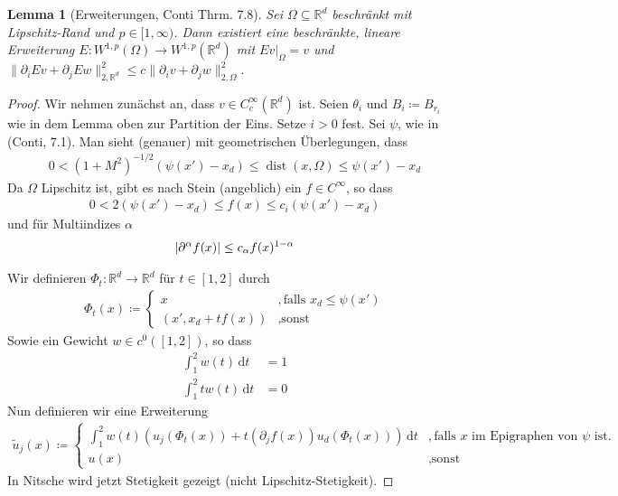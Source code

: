\documentclass{scrartcl}
\newcounter{everything}
\newtheorem{lemma}[everything]{Lemma}
\def\R{\mathbb{R}}
\newcommand{\dif}[1]{\,\mathrm{d} #1}
\newcommand{\norm}[1]{\lVert #1 \rVert}
\DeclareMathOperator{\dist}{dist}			%
\DeclarePairedDelimiter{\abs}{|}{|}
\begin{document}
\begin{lemma}[Erweiterungen, Conti Thrm. 7.8]
	Sei $\Omega\subseteq\R^d$ beschränkt mit Lipschitz-Rand und $p\in[1,\infty)$. Dann existiert eine beschränkte, lineare Erweiterung $E\colon W^{1,p}(\Omega)\to W^{1,p}(\R^d)$ mit $Ev\vert_\Omega = v$ und $\norm{\partial_iEv+\partial_jEw}_{2,\R^d}^2 \leq c\norm{\partial_iv+\partial_jw}_{2,\Omega}^2$.
\end{lemma}
\begin{proof}
	Wir nehmen zunächst an, dass $v\in C_c^\infty(\R^d)$ ist. Seien $\theta_i$ und $B_i\coloneqq B_{r_i}$ wie in dem Lemma oben zur Partition der Eins. Setze $i>0$ fest. Sei $\psi$, wie in (Conti, 7.1). Man sieht  (genauer) mit geometrischen Überlegungen, dass
	\begin{align*}
		0<(1+M^2)^{-1/2}(\psi(x')-x_d)\leq \dist(x,\Omega)\leq \psi(x')-x_d
	\end{align*}
	Da $\Omega$ Lipschitz ist, gibt es nach Stein (angeblich) ein $f\in C^\infty$, so dass
	\begin{align*}
		0 < 2(\psi(x')-x_d)\leq f(x)\leq c_i(\psi(x')-x_d)
	\end{align*}
	und für Multiindizes $\alpha$
	\begin{align*}
		\abs{\partial^\alpha f(x)}\leq c_\alpha f(x)^{1-\alpha}
	\end{align*}
	
	
	Wir definieren $\Phi_t\colon\R^d\to\R^d$ für $t\in[1,2]$ durch
	\begin{align*}
		\Phi_t(x)\coloneqq\begin{cases}
			x &,\text{falls }x_d\leq\psi(x') \\
			(x',x_d+tf(x)) &,\text{sonst}
		\end{cases}
	\end{align*}
	Sowie ein Gewicht $w\in c^0([1,2])$, so dass
	\begin{align*}
		\int_1^2w(t)\dif t &= 1 \\
		\int_1^2tw(t)\dif t &= 0
	\end{align*}
	Nun definieren wir eine Erweiterung
	\begin{align*}
		\tilde{u}_j(x)\coloneqq\begin{cases}
			\int_1^2w(t)\left(u_j(\Phi_t(x))+t(\partial_jf(x))u_d(\Phi_t(x))\right)\dif t &,\text{falls }x\text{ im Epigraphen von }\psi\text{ ist.} \\
			u(x) &,\text{sonst}
		\end{cases}
	\end{align*}
	In Nitsche wird jetzt Stetigkeit gezeigt (nicht Lipschitz-Stetigkeit).	
	

\end{proof}
\end{document}
